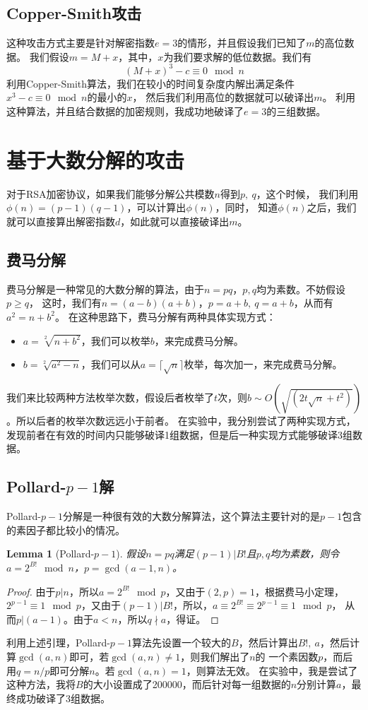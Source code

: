 \documentclass{ctexart}
\newtheorem{lemma}[theorem]{Lemma}
\begin{document}
\subsection{Copper-Smith攻击}
这种攻击方式主要是针对解密指数$e=3$的情形，并且假设我们已知了$m$的高位数据。
我们假设$m=M+x$，其中，$x$为我们要求解的低位数据。我们有
$$
(M+x)^3-c\equiv 0\mod n
$$
利用Copper-Smith算法，我们在较小的时间复杂度内解出满足条件$x^3-c\equiv 0\mod n$的最小的$x$，
然后我们利用高位的数据就可以破译出$m$。
利用这种算法，并且结合数据的加密规则，我成功地破译了$e=3$的三组数据。
\section{基于大数分解的攻击}
对于RSA加密协议，如果我们能够分解公共模数$n$得到$p,\ q$，这个时候，
我们利用$\phi(n)=(p-1)(q-1)$，可以计算出$\phi(n)$，同时，
知道$\phi(n)$之后，我们就可以直接算出解密指数$d$，如此就可以直接破译出$m$。
\subsection{费马分解}
费马分解是一种常见的大数分解的算法，由于$n=pq$，$p,q$均为素数。不妨假设$p\geqslant q$，
这时，我们有$n=(a-b)(a+b)$，$p=a+b,\ q=a+b$，从而有$a^2=n+b^2$。
在这种思路下，费马分解有两种具体实现方式：
\begin{itemize}
    \item $a=\sqrt[2]{n+b^2}$，我们可以枚举$b$，来完成费马分解。
    \item $b=\sqrt[2]{a^2-n}$，我们可以从$a=\lceil \sqrt{n}\rceil$枚举，每次加一，来完成费马分解。
\end{itemize}
我们来比较两种方法枚举次数，假设后者枚举了$t$次，则$b\sim O(\sqrt{(2t\sqrt{n}+t^2)})$。所以后者的枚举次数远远小于前者。
在实验中，我分别尝试了两种实现方式，发现前者在有效的时间内只能够破译1组数据，但是后一种实现方式能够破译3组数据。
\subsection{Pollard-\texorpdfstring{$p-1$}分解}
Pollard-$p-1$分解是一种很有效的大数分解算法，这个算法主要针对的是$p-1$包含的素因子都比较小的情况。
\begin{lemma}[Pollard-$p-1$]
    假设$n=pq$满足$(p-1)\vert B!$且$p,q$均为素数，则令$a=2^{B!}\mod n$，$p=\gcd(a-1,n)$。
\end{lemma}
\begin{proof}
    由于$p|n$，所以$a=2^{B!}\mod p$，又由于$(2,p)=1$，根据费马小定理，
    $2^{p-1}\equiv 1\mod p$，又由于$(p-1)\vert B!$，所以，$a\equiv 2^{B!}\equiv 2^{p-1}\equiv 1\mod p$，
    从而$p|(a-1)$。由于$a<n$，所以$q \nmid a$，得证。
\end{proof}
利用上述引理，Pollard-$p-1$算法先设置一个较大的$B$，然后计算出$B!,\ a$，然后计算$\gcd(a,n)$即可，若$\gcd(a,n)\neq 1$，则我们解出了$n$的
一个素因数$p$，而后用$q=n/p$即可分解$n$。若$\gcd(a,n)=1$，则算法无效。
在实验中，我是尝试了这种方法，我将$B$的大小设置成了200000，而后针对每一组数据的$n$分别计算$a$，最终成功破译了3组数据。
\end{document}
